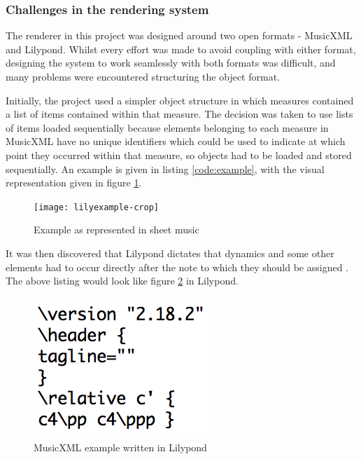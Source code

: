 \subsubsection{Challenges in the rendering system}
The renderer in this project was designed around two open formats - MusicXML and Lilypond. Whilst every effort was made to avoid coupling with either format, designing the system to work seamlessly with both formats was difficult, and many problems were encountered structuring the object format.

Initially, the project used a simpler object structure in which measures contained a list of items contained within that measure. The decision was taken to use lists of items loaded sequentially because elements belonging to each measure in MusicXML have no unique identifiers which could be used to indicate at which point they occurred within that measure, so objects had to be loaded and stored sequentially. An example is given in listing \ref{code:example}, with the visual representation given in figure \ref{fig:lilyexample}.
    
    
\begin{figure}[H]
\centering
\texttt{[image: lilyexample-crop]}
\caption{Example as represented in sheet music}
\label{fig:lilyexample}	
\end{figure}


It was then discovered that Lilypond dictates that dynamics and some other elements had to occur directly after the note to which they should be assigned \parencite{ExpressionLilypond}.  The above listing would look like figure \ref{code:lily} in Lilypond.

\begin{figure}[H]
\centering
\includegraphics{lilyexample-code}
\caption{MusicXML example written in Lilypond}
\label{code:lily}	
\end{figure}


